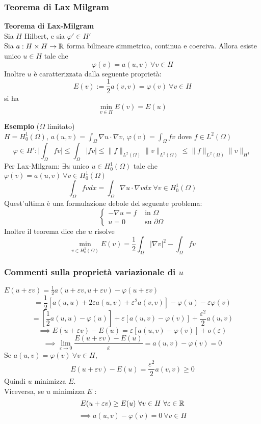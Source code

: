 \subsubsection{Teorema di Lax Milgram}
\begin{tcolorbox}
\textbf{Teorema di Lax-Milgram}
\\Sia $H$ Hilbert, e sia $\varphi'\in H'$ 
\\Sia $a:H\times H\to \mathbb{R} $ forma bilineare simmetrica, continua e coerciva.
Allora esiste unico $u\in H$ tale che
\[\varphi(v)=a(u,v)\ \forall v\in H\]
Inoltre $u$ è caratterizzata dalla seguente proprietà: 
\[E(v):=\frac{1}{2}a(v,v)=\varphi(v)\ \forall v\in H\]
si ha 
\[\min_{v\in H}E(v)=E(u)\]
\end{tcolorbox}
\textbf{Esempio} ($\Omega$ limitato)
\\$H=H_0^1(\Omega)$, $a(u,v)=\int_{\Omega}^{} \nabla u\cdot \nabla v $, $\varphi(v)=\int_{\Omega}^{} fv $ dove $f\in L^{2}(\Omega)$ 
\[\varphi\in H':\bigg|\int_{\Omega}^{} fv\bigg|\le \int_{\Omega}^{} |fv|\le \|f\|_{L^{2}(\Omega)}\|v\|_{L^{2}(\Omega)}\le \|f\|_{L^{2}(\Omega)}\|v\|_{H^1}\]
Per Lax-Milgram: $\exists u$ unico $u\in H^1_0(\Omega)$ tale che $\varphi(v)=a(u,v)\ \forall v\in H_0^1(\Omega)$ 
\[\int_{\Omega}^{} fvdx=\int_{\Omega}^{} \nabla u\cdot \nabla vdx\ \forall v\in H_0^1(\Omega)\]
Quest'ultima è una formulazione debole del seguente problema:
\[\begin{cases}
	-\nabla u=f&\text{ in }\Omega
	\\u=0&\text{ su }\partial\Omega
\end{cases}\]
Inoltre il teorema dice che $u$ risolve 
\[\min_{v\in H_0^1(\Omega)}E(v)=\frac{1}{2} \int_{\Omega}^{} |\nabla v|^2-\int_{\Omega}^{} fv\]
\subsubsection{Commenti sulla proprietà variazionale di $u$ }
$E(u+\varepsilon v)=\frac{1}{2}a(u+\varepsilon v,u+\varepsilon v)-\varphi(u+\varepsilon v)$
\[=\frac{1}{2}[a(u,u)+2\varepsilon a(u,v)+\varepsilon^2a(v,v)]-\varphi(u)-\varepsilon\varphi(v)\]
\[=[\frac{1}{2}a(u,u)-\varphi(u)]+\varepsilon[a(u,v)-\varphi(v)]+ \frac{\varepsilon^2}{2}a(u,v)\]
\[\implies E(u+\varepsilon v)-E(u)=\varepsilon [a(u,v)-\varphi(v)]+o(\varepsilon)\]
\[\implies \lim_{\varepsilon \to 0} \frac{E(u+\varepsilon v)-E(u)}{\varepsilon}=a(u,v)-\varphi(v)=0\]
Se $a(u,v)=\varphi(v)\ \forall v\in H$, 
\[E(u+\varepsilon v)-E(u)= \frac{\varepsilon^2}{2}a(v,v)\ge 0\]
Quindi $u$ minimizza $E$.
\\Viceversa, se $u $ minimizza $E$ :
\[E(u+\varepsilon v)\ge E(u)\ \forall v\in H\ \forall \varepsilon\in \mathbb{R}\]
\[\implies a(u,v)-\varphi(v)=0\ \forall v\in H\]


